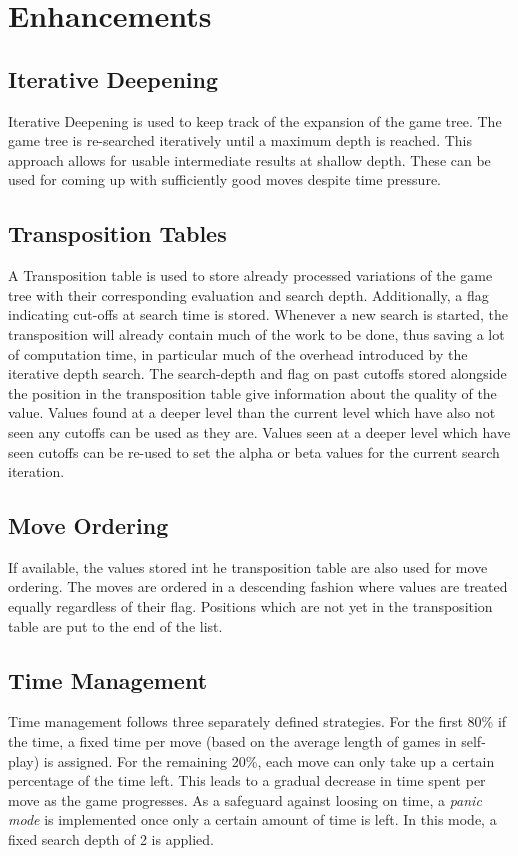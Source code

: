 \section{Enhancements}

\subsection{Iterative Deepening}
Iterative Deepening is used to keep track of the expansion of the game tree. The game tree is re-searched iteratively until a maximum depth is reached. This approach allows for usable intermediate results at shallow depth. These can be used for coming up with sufficiently good moves despite time pressure.

\subsection{Transposition Tables}

A Transposition table is used to store already processed variations of the game tree with their corresponding evaluation and search depth. Additionally, a flag indicating cut-offs at search time is stored. Whenever a new search is started, the transposition will already contain much of the work to be done, thus saving a lot of computation time, in particular much of the overhead introduced by the iterative depth search. The search-depth and flag on past cutoffs stored alongside the position in the transposition table give information about the quality of the value. Values found at a deeper level than the current level which have also not seen any cutoffs can be used as they are. Values seen at a deeper level which have seen cutoffs can be re-used to set the alpha or beta values for the current search iteration.

\subsection{Move Ordering}
If available, the values stored int he transposition table are also used for move ordering. The moves are ordered in a descending fashion where values are treated equally regardless of their flag. Positions which are not yet in the transposition table are put to the end of the list.

\subsection{Time Management}
Time management follows three separately defined strategies. For the first 80\% if the time, a fixed time per move (based on the average length of games in self-play) is assigned. For the remaining 20\%, each move can only take up a certain percentage of the time left. This leads to a gradual decrease in time spent per move as the game progresses. As a safeguard against loosing on time, a \textit{panic mode} is implemented once only a certain amount of time is left. In this mode, a fixed search depth of 2 is applied.

